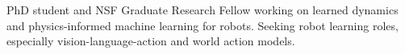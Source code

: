 PhD student and NSF Graduate Research Fellow working on learned dynamics and physics-informed machine learning for robots. Seeking robot learning roles, especially vision-language-action and world action models.
